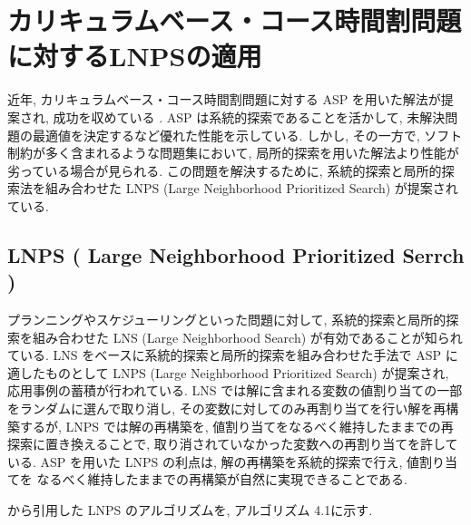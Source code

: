 \chapter{カリキュラムベース・コース時間割問題に対するLNPSの適用}

近年, カリキュラムベース・コース時間割問題に対する ASP を用いた解法が提案され, 
成功を収めている
\cite{%
 banbara17:ramp}. 
ASP は系統的探索であることを活かして, 
未解決問題の最適値を決定するなど優れた性能を示している. 
しかし, その一方で, ソフト制約が多く含まれるような問題集において, 
局所的探索を用いた解法より性能が劣っている場合が見られる. 
この問題を解決するために, 系統的探索と局所的探索法を組み合わせた 
LNPS (Large Neighborhood Prioritized Search) 
\cite{%
 hayama19:kobe}
 が提案されている. 

\section{LNPS ( Large Neighborhood Prioritized Serrch )}

プランニングやスケジューリングといった問題に対して, 
系統的探索と局所的探索を組み合わせた 
LNS (Large Neighborhood Search) が有効であることが知られている. 
LNS をベースに系統的探索と局所的探索を組み合わせた手法で ASP に適したものとして 
LNPS (Large Neighborhood Prioritized Search) が提案され, 
応用事例の蓄積が行われている. 
LNS では解に含まれる変数の値割り当ての一部をランダムに選んで取り消し, 
その変数に対してのみ再割り当てを行い解を再構築するが, 
LNPS では解の再構築を, 
値割り当てをなるべく維持したままでの再探索に置き換えることで, 
取り消されていなかった変数への再割り当てを許している. 
ASP を用いた LNPS の利点は, 解の再構築を系統的探索で行え, 値割り当てを
なるべく維持したままでの再構築が自然に実現できることである. 

\cite{%
 hayama19:kobe}
 から引用した LNPS のアルゴリズムを, アルゴリズム 4.1に示す.
\newpage

